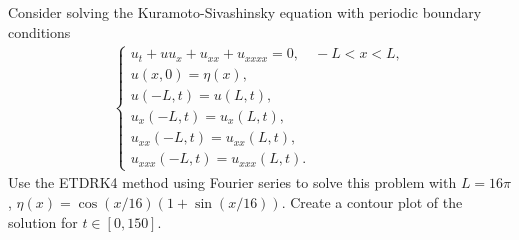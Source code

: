 \documentclass[12pt]{report}
\begin{document}
\newpage



\begin{problem}
    Consider solving the Kuramoto-Sivashinsky equation with periodic boundary conditions
 \begin{align*}
    \begin{cases} u_t + u u_x + u_{xx} + u_{xxxx} = 0, \quad -L < x <L,\\
      u(x,0) = \eta(x),\\
      u(-L,t) = u(L,t),\\
      u_x(-L,t) = u_x(L,t),\\
      u_{xx}(-L,t) = u_{xx}(L,t),\\
      u_{xxx}(-L,t) = u_{xxx}(L,t).
    \end{cases}
 \end{align*}
 Use the ETDRK4 method using Fourier series to solve this problem with $L = 16 \pi$, $\eta(x) = \cos(x/16) (1 + \sin(x/16))$.  Create a contour plot of the solution for $t \in [0,150]$.
\end{problem}
\end{document}

